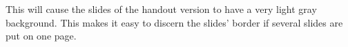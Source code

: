 This will cause the slides of the handout version to have a very
light gray background. This makes it easy to discern the slides'
border if several slides are put on one page.









